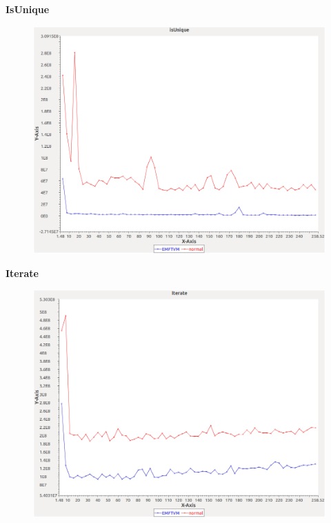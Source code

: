 \noindent\textbf{IsUnique}

\begin{figure}[h]
\centering
\includegraphics[width=\textwidth]{graphs/set/isUnique}
\end{figure}
\pagebreak

\noindent\textbf{Iterate}

\begin{figure}[h]
\centering
\includegraphics[width=\textwidth]{graphs/set/Iterate}
\end{figure}
\pagebreak

